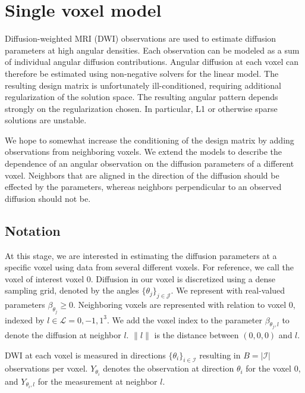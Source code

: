 \documentclass[11pt]{amsart}
\newcommand{\tj}{\theta_j}
\newcommand{\ti}{\theta_i}
\newcommand{\yti}{Y_{\theta_i}}
\newcommand{\ytil}{Y_{\theta_i,l}}
\begin{document}
\section{Single voxel model}
Diffusion-weighted MRI (DWI) observations are used to estimate diffusion parameters at high angular densities. 
Each observation can be modeled as a sum of individual angular diffusion contributions. 
Angular diffusion at each voxel can therefore be estimated using non-negative solvers for the linear model. 
The resulting design matrix is unfortunately ill-conditioned, requiring additional regularization of the solution space. 
The resulting angular pattern depends strongly on the regularization chosen. 
In particular, L1 or otherwise sparse solutions are unstable. 

We hope to somewhat increase the conditioning of the design matrix by adding observations 
from neighboring voxels. We extend the models to describe the dependence of 
an angular observation on the diffusion parameters of a different voxel. Neighbors 
that are aligned in the direction of the diffusion should be effected by the parameters,  
whereas neighbors perpendicular to an observed diffusion should not be. 

\subsection{Notation}

At this stage, we are interested in estimating the diffusion parameters at a 
specific voxel using data from several different voxels. 
For reference, we call the voxel of interest voxel 0. 
Diffusion in our voxel is discretized using a dense sampling grid, denoted by
the angles $\{\tj\}_{j \in \mathcal{J}}$. 
We represent with real-valued parameters $\beta_{\tj}\geq 0$.
Neighboring voxels are represented with relation to voxel $0$, indexed by $l \in \mathcal{L} = {0,-1,1}^3$. 
We add the voxel index to the parameter $\beta_{\tj, l}$ to denote the diffusion at neighbor $l$. 
$\|l\|$ is the distance between $(0,0,0)$ and $l$.

DWI at each voxel is measured in directions $\{\ti\}_{ i \in \mathcal{I}}$ resulting in  $B = |\mathcal{I}| $ observations per voxel.  
$\yti$ denotes the observation at direction $\ti$ for the voxel 0, and $\ytil$ for the 
measurement at neighbor $l$. 
\end{document}
